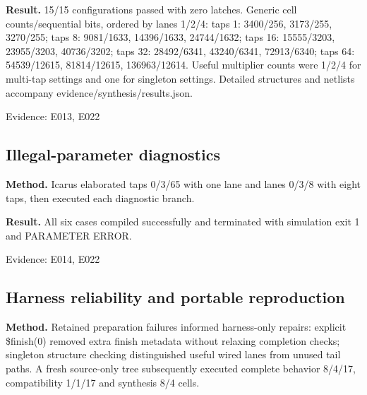 \documentclass[11pt,a4paper]{article}
\begin{document}
\textbf{Result.} 15/\allowbreak{}15 configurations passed with zero latches. Generic cell counts/\allowbreak{}sequential bits,\allowbreak{} ordered by lanes 1/\allowbreak{}2/\allowbreak{}4: taps 1: 3400/\allowbreak{}256,\allowbreak{} 3173/\allowbreak{}255,\allowbreak{} 3270/\allowbreak{}255; taps 8: 9081/\allowbreak{}1633,\allowbreak{} 14396/\allowbreak{}1633,\allowbreak{} 24744/\allowbreak{}1632; taps 16: 15555/\allowbreak{}3203,\allowbreak{} 23955/\allowbreak{}3203,\allowbreak{} 40736/\allowbreak{}3202; taps 32: 28492/\allowbreak{}6341,\allowbreak{} 43240/\allowbreak{}6341,\allowbreak{} 72913/\allowbreak{}6340; taps 64: 54539/\allowbreak{}12615,\allowbreak{} 81814/\allowbreak{}12615,\allowbreak{} 136963/\allowbreak{}12614. Useful multiplier counts were 1/\allowbreak{}2/\allowbreak{}4 for multi-tap settings and one for singleton settings. Detailed structures and netlists accompany evidence/\allowbreak{}synthesis/\allowbreak{}results.json.

{\small Evidence: E013,\allowbreak{} E022}

\subsection{Illegal-parameter diagnostics}

\textbf{Method.} Icarus elaborated taps 0/\allowbreak{}3/\allowbreak{}65 with one lane and lanes 0/\allowbreak{}3/\allowbreak{}8 with eight taps,\allowbreak{} then executed each diagnostic branch.

\textbf{Result.} All six cases compiled successfully and terminated with simulation exit 1 and PARAMETER ERROR.

{\small Evidence: E014,\allowbreak{} E022}

\subsection{Harness reliability and portable reproduction}

\textbf{Method.} Retained preparation failures informed harness-only repairs: explicit \$finish(\allowbreak{}0)\allowbreak{} removed extra finish metadata without relaxing completion checks; singleton structure checking distinguished useful wired lanes from unused tail paths. A fresh source-only tree subsequently executed complete behavior 8/\allowbreak{}4/\allowbreak{}17,\allowbreak{} compatibility 1/\allowbreak{}1/\allowbreak{}17 and synthesis 8/\allowbreak{}4 cells.
\end{document}
